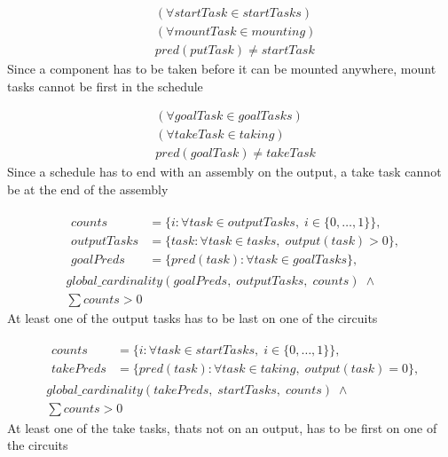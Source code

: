 \documentclass[10pt,a4paper]{report}
\begin{document}
\begin{equation}\label{eq:80}
\begin{aligned}
&(\forall startTask \in startTasks)\\
&(\forall mountTask \in mounting)\\
&pred(putTask) \neq startTask 
\end{aligned}
\end{equation}
Since a component has to be taken before it can be mounted anywhere, mount tasks cannot be first in the schedule

\begin{equation}\label{eq:81}
\begin{aligned}
&(\forall goalTask \in goalTasks) \\
&(\forall takeTask \in taking) \\
&pred(goalTask) \neq takeTask
\end{aligned}
\end{equation}
Since a schedule has to end with an assembly on the output, a take task cannot be at the end of the assembly

\begin{equation}
\begin{aligned}\label{eq:82}
&\begin{aligned}
counts &= \{i : \forall task \in outputTasks, \; i \in \{0 , \ldots , 1\}\}, \\
outputTasks &= \{task : \forall task \in tasks, \; output(task) > 0\}, \\
goalPreds &= \{pred(task) : \forall task \in goalTasks\},
\end{aligned} \\
&global\_cardinality(goalPreds, \; outputTasks, \; counts) \; \land\\
&\sum counts > 0
\end{aligned}
\end{equation}
At least one of the output tasks has to be last on one of the circuits


\begin{equation}
\begin{aligned}\label{eq:83}
&\begin{aligned}
counts &= \{i : \forall task \in startTasks, \; i \in \{0 , \ldots , 1\}\}, \\
takePreds &= \{pred(task) : \forall task \in taking, \; output(task) = 0\}, 
\end{aligned}\\
&global\_cardinality(takePreds, \; startTasks, \; counts) \; \land\\
&\sum counts > 0
\end{aligned}
\end{equation}
At least one of the take tasks, thats not on an output, has to be first on one of the circuits
\end{document}
